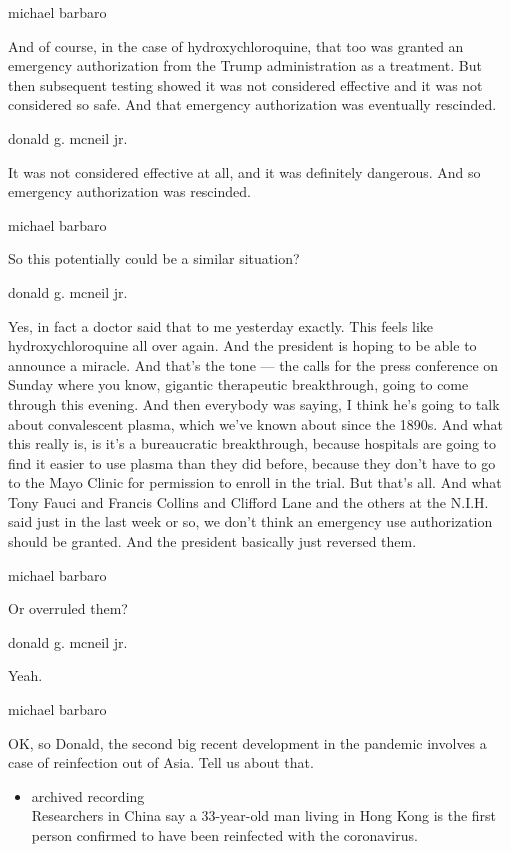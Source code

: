 michael barbaro

And of course, in the case of hydroxychloroquine, that too was granted
an emergency authorization from the Trump administration as a treatment.
But then subsequent testing showed it was not considered effective and
it was not considered so safe. And that emergency authorization was
eventually rescinded.

donald g. mcneil jr.

It was not considered effective at all, and it was definitely dangerous.
And so emergency authorization was rescinded.

michael barbaro

So this potentially could be a similar situation?

donald g. mcneil jr.

Yes, in fact a doctor said that to me yesterday exactly. This feels like
hydroxychloroquine all over again. And the president is hoping to be
able to announce a miracle. And that's the tone --- the calls for the
press conference on Sunday where you know, gigantic therapeutic
breakthrough, going to come through this evening. And then everybody was
saying, I think he's going to talk about convalescent plasma, which
we've known about since the 1890s. And what this really is, is it's a
bureaucratic breakthrough, because hospitals are going to find it easier
to use plasma than they did before, because they don't have to go to the
Mayo Clinic for permission to enroll in the trial. But that's all. And
what Tony Fauci and Francis Collins and Clifford Lane and the others at
the N.I.H. said just in the last week or so, we don't think an emergency
use authorization should be granted. And the president basically just
reversed them.

michael barbaro

Or overruled them?

donald g. mcneil jr.

Yeah.

michael barbaro

OK, so Donald, the second big recent development in the pandemic
involves a case of reinfection out of Asia. Tell us about that.

\begin{itemize}
\tightlist
\item
  archived recording\\
  Researchers in China say a 33-year-old man living in Hong Kong is the
  first person confirmed to have been reinfected with the coronavirus.
\end{itemize}

